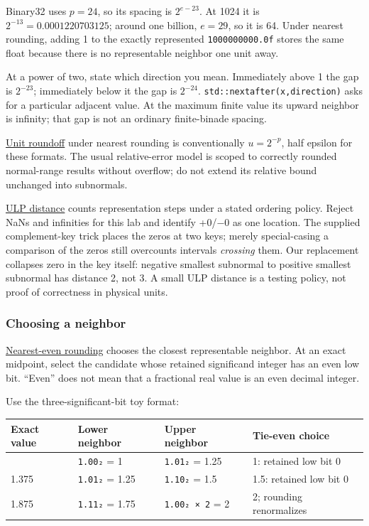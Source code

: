 Binary32 uses \(p=24\), so its spacing is \(2^{e-23}\). At 1024 it is \(2^{-13}=0.0001220703125\); around one billion, \(e=29\), so it is 64. Under nearest rounding, adding 1 to the exactly represented \texttt{1\textquotesingle{}000\textquotesingle{}000\textquotesingle{}000.0f} stores the same float because there is no representable neighbor one unit away.

At a power of two, state which direction you mean. Immediately above 1 the gap is \(2^{-23}\); immediately below it the gap is \(2^{-24}\). \texttt{std::nextafter(x,direction)} asks for a particular adjacent value. At the maximum finite value its upward neighbor is infinity; that gap is not an ordinary finite-binade spacing.

\hyperref[appendix-bc44f7b42f42]{Unit roundoff} under nearest rounding is conventionally \(u=2^{-p}\), half epsilon for these formats. The usual relative-error model is scoped to correctly rounded normal-range results without overflow; do not extend its relative bound unchanged into subnormals.

\hyperref[appendix-deca299ae4b8]{ULP distance} counts representation steps under a stated ordering policy. Reject NaNs and infinities for this lab and identify +0/−0 as one location. The supplied complement-key trick places the zeros at two keys; merely special-casing a comparison of the zeros still overcounts intervals \emph{crossing} them. Our replacement collapses zero in the key itself: negative smallest subnormal to positive smallest subnormal has distance 2, not 3. A small ULP distance is a testing policy, not proof of correctness in physical units.

\subsubsection{Choosing a neighbor}\label{05-engine-i-ch001-choosing-a-neighbor}

\hyperref[appendix-614afe1de592]{Nearest-even rounding} chooses the closest representable neighbor. At an exact midpoint, select the candidate whose retained significand integer has an even low bit. ``Even'' does not mean that a fractional real value is an even decimal integer.

Use the three-significant-bit toy format:

{\def\LTcaptype{none} %
\begin{longtable}[]{@{}llll@{}}
\toprule\noalign{}
Exact value & Lower neighbor & Upper neighbor & Tie-even choice \\
\midrule\noalign{}
\endhead
\bottomrule\noalign{}
\endlastfoot
1.125 & \texttt{1.00₂} = 1 & \texttt{1.01₂} = 1.25 & 1: retained low bit 0 \\
1.375 & \texttt{1.01₂} = 1.25 & \texttt{1.10₂} = 1.5 & 1.5: retained low bit 0 \\
1.875 & \texttt{1.11₂} = 1.75 & \texttt{1.00₂\ ×\ 2} = 2 & 2; rounding renormalizes \\
\end{longtable}
}

